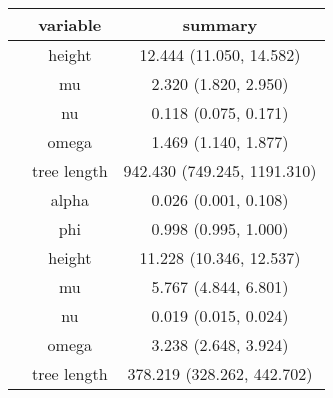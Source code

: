 \begingroup
\fontsize{5.2pt}{6.3pt}\selectfont
\begin{longtable}{l|cc}
\toprule
 & variable & summary \\ 
\midrule\addlinespace[2.5pt]
\multirow{7}{=}{Extended Beta} & height & 12.444 (11.050, 14.582) \\ 
 & mu & 2.320 (1.820, 2.950) \\ 
 & nu & 0.118 (0.075, 0.171) \\ 
 & omega & 1.469 (1.140, 1.877) \\ 
 & tree length & 942.430 (749.245, 1191.310) \\ 
 & alpha & 0.026 (0.001, 0.108) \\ 
 & phi & 0.998 (0.995, 1.000) \\ 
\midrule\addlinespace[2.5pt]
\multirow{5}{=}{Kingman} & height & 11.228 (10.346, 12.537) \\ 
 & mu & 5.767 (4.844, 6.801) \\ 
 & nu & 0.019 (0.015, 0.024) \\ 
 & omega & 3.238 (2.648, 3.924) \\ 
 & tree length & 378.219 (328.262, 442.702) \\ 
\bottomrule
\end{longtable}
\endgroup

